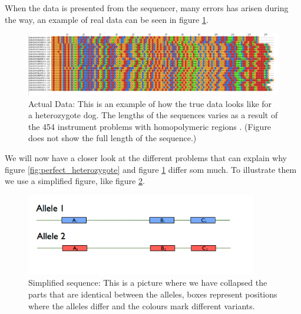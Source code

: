 \documentclass[a4paper,11pt]{kth-mag}
\begin{document}
\vspace{5 mm}


When the data is presented from the sequencer, many errors has arisen during the way, an example of real data can be seen in figure \ref{fig:align_chaos}.

\begin{figure}[ht]
	\centering
		\includegraphics[width=\textwidth]{../pictures/align_chaos_cropped.png}
	\caption{Actual Data: This is an example of how the true data looks like for a heterozygote dog. The lengths of the sequences varies as a result of the 454 instrument problems with homopolymeric regions \cite{454_problems}. (Figure does not show the full length of the sequence.)}
	\label{fig:align_chaos}
\end{figure}

\vspace{5 mm}


We will now have a closer look at the different problems that can explain why figure \ref{fig:perfect_heterozygote} and figure \ref{fig:align_chaos} differ som much. To illustrate them we use a simplified figure, like figure \ref{fig:true_alleles}.

\begin{figure}[ht]
	\centering
		\includegraphics[width=0.9\textwidth]{../pictures/True_Alleles.png}
	\caption{Simplified sequence: This is a picture where we have collapsed the parts that are identical between the alleles, boxes represent positions where the alleles differ and the colours mark different variants.}
	\label{fig:true_alleles}
\end{figure}
\end{document}
